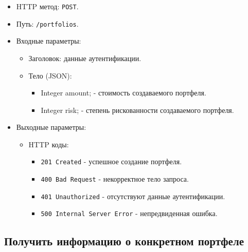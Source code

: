 \documentclass[a4paper, 14pt]{article}
\begin{document}
\begin{itemize}
    \item HTTP метод: \texttt{POST}.
    \item Путь: \texttt{/portfolios}.
    \item Входные параметры:
    \begin{itemize}
        \item Заголовок: данные аутентификации.
        \item Тело (JSON):
        \begin{itemize}
            \item Integer amount; - стоимость создаваемого портфеля.
            \item Integer risk; - степень рискованности создаваемого портфеля.
        \end{itemize}
    \end{itemize}
    \item Выходные параметры:
    \begin{itemize}
        \item HTTP коды:
        \begin{itemize}
            \item \texttt{201 Created} - успешное создание портфеля.
            \item \texttt{400 Bad Request} - некорректное тело запроса.
            \item \texttt{401 Unauthorized} - отсутствуют данные аутентификации.
            \item \texttt{500 Internal Server Error} - непредвиденная ошибка.
        \end{itemize}
    \end{itemize}
\end{itemize}

\subsection{Получить информацию о конкретном портфеле}
\end{document}
